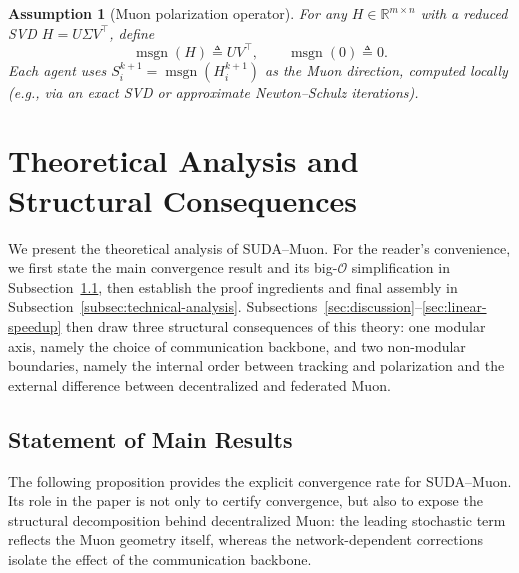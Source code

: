 \documentclass{article}
\newtheorem{assumption}{Assumption}
\newcommand{\sudamuon}{SUDA--Muon}
\begin{document}
\begin{assumption}[Muon polarization operator]
    \label{assump:muon}
    For any $H\in\mathbb{R}^{m\times n}$ with a reduced SVD $H=U\Sigma V^\top$, define
    \begin{equation}
    \label{eq:msgn}
        \operatorname{msgn}(H)\triangleq UV^\top,\qquad \operatorname{msgn}(0)\triangleq 0.
    \end{equation}
    Each agent uses $S_i^{k+1}=\operatorname{msgn}(H_i^{k+1})$ as the Muon direction, computed locally
    (e.g., via an exact SVD or approximate Newton--Schulz iterations).
\end{assumption}


\section{Theoretical Analysis and Structural Consequences}\label{sec:theory}

We present the theoretical analysis of \sudamuon{}.
For the reader's convenience, we first state the main convergence result and its big-$\mathcal{O}$ simplification in Subsection~\ref{subsec:main-statement}, then establish the proof ingredients and final assembly in Subsection~\ref{subsec:technical-analysis}. Subsections~\ref{sec:discussion}--\ref{sec:linear-speedup} then draw three structural consequences of this theory: one modular axis, namely the choice of communication backbone, and two non-modular boundaries, namely the internal order between tracking and polarization and the external difference between decentralized and federated Muon.

\subsection{Statement of Main Results}
\label{subsec:main-statement}

The following proposition provides the explicit convergence rate for \sudamuon{}. Its role in the paper is not only to certify convergence, but also to expose the structural decomposition behind decentralized Muon: the leading stochastic term reflects the Muon geometry itself, whereas the network-dependent corrections isolate the effect of the communication backbone.
\end{document}
